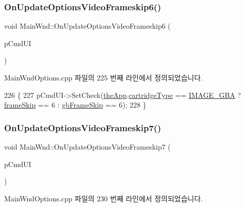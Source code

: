 \subsubsection{\texorpdfstring{On\+Update\+Options\+Video\+Frameskip6()}{OnUpdateOptionsVideoFrameskip6()}}
{\footnotesize\ttfamily void Main\+Wnd\+::\+On\+Update\+Options\+Video\+Frameskip6 (\begin{DoxyParamCaption}\item[{C\+Cmd\+UI $\ast$}]{p\+Cmd\+UI }\end{DoxyParamCaption})\hspace{0.3cm}{\ttfamily [protected]}}



Main\+Wnd\+Options.\+cpp 파일의 225 번째 라인에서 정의되었습니다.


\begin{DoxyCode}
226 \{
227   pCmdUI->SetCheck(\mbox{\hyperlink{_v_b_a_8cpp_a8095a9d06b37a7efe3723f3218ad8fb3}{theApp}}.\mbox{\hyperlink{class_v_b_a_af300759fcbc7eeb00ce73f956fc5ddb7}{cartridgeType}} == \mbox{\hyperlink{_util_8h_aef8b88d56fdf9a25f990a68d80c014d8a25f0ac1f3a37d568346fedece32e4bfb}{IMAGE\_GBA}} ? 
      \mbox{\hyperlink{_globals_8cpp_a668e22999d7fcea3ed14130fd680b795}{frameSkip}} == 6 : \mbox{\hyperlink{_g_b_8cpp_a2139360d32d74969f470ef05414ecaf8}{gbFrameSkip}} == 6);
228 \}
\end{DoxyCode}
\mbox{\label{class_main_wnd_a3d78f5ca60b11eae68cdc77c4a404331}} 
\subsubsection{\texorpdfstring{On\+Update\+Options\+Video\+Frameskip7()}{OnUpdateOptionsVideoFrameskip7()}}
{\footnotesize\ttfamily void Main\+Wnd\+::\+On\+Update\+Options\+Video\+Frameskip7 (\begin{DoxyParamCaption}\item[{C\+Cmd\+UI $\ast$}]{p\+Cmd\+UI }\end{DoxyParamCaption})\hspace{0.3cm}{\ttfamily [protected]}}



Main\+Wnd\+Options.\+cpp 파일의 230 번째 라인에서 정의되었습니다.


